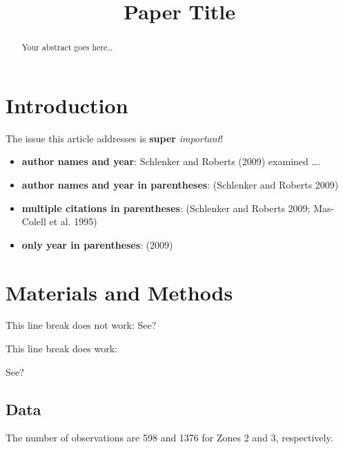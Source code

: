 \documentclass[
  12pt,
  letterpaper,
  DIV=11,
  numbers=noendperiod]{scrartcl}
\title{Paper Title}
\author{}
\date{}
\begin{document}

\maketitle
\begin{abstract}
Your abstract goes here\ldots{}
\end{abstract}
\ifdefined\Shaded\renewenvironment{Shaded}{\begin{tcolorbox}[boxrule=0pt, sharp corners, borderline west={3pt}{0pt}{shadecolor}, interior hidden, frame hidden, breakable, enhanced]}{\end{tcolorbox}}\fi

\hypertarget{introduction}{%
\section{Introduction}\label{introduction}}

The issue this article addresses is \textbf{super} \emph{important}!

\begin{itemize}
\item
  \textbf{author names and year}: Schlenker and Roberts (2009) examined
  \ldots.
\item
  \textbf{author names and year in parentheses}: (Schlenker and Roberts
  2009)
\item
  \textbf{multiple citations in parentheses}: (Schlenker and Roberts
  2009; Mas-Colell et al. 1995)
\item
  \textbf{only year in parentheses}: (2009)
\end{itemize}

\newpage

\hypertarget{materials-and-methods}{%
\section{Materials and Methods}\label{materials-and-methods}}

This line break does not work: See?

This line break does work:

See?

\hypertarget{data}{%
\subsection{Data}\label{data}}

The number of observations are 598 and 1376 for Zones 2 and 3,
respectively.
\end{document}
